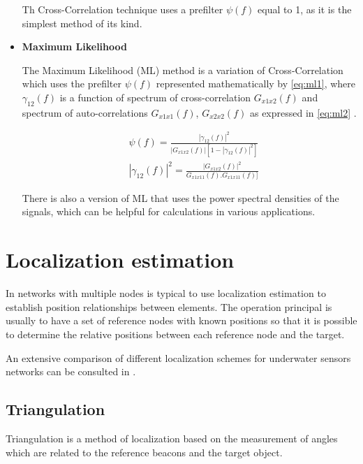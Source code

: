 \begin{itemize}
Th Cross-Correlation technique uses a prefilter $\psi(f)$ equal to 1, as it is the simplest method of its kind.

	\item \textbf{Maximum Likelihood}

The Maximum Likelihood (ML) method is a variation of Cross-Correlation which uses the prefilter $\psi(f)$ represented mathematically by \ref{eq:ml1}, where $\gamma_{12}(f)$ is a function of spectrum of cross-correlation $G_{x1x2}(f)$ and spectrum of auto-correlations $G_{x1x1}(f)$, $G_{x2x2}(f)$ as expressed in \ref{eq:ml2} \cite{crosscorr}.

\begin{eqnarray}
& \psi(f) = \frac{|\gamma_{12}(f)|^2}{|G_{x1x2}(f)|[1-|\gamma_{12}(f)|^2]}
\label{eq:ml1} \\
& |\gamma_{12}(f)|^2 = \frac{|G_{x1x2}(f)|^2}{G_{x1x11}(f) . G_{x1x11}(f)]}
\label{eq:ml2} 
\end{eqnarray}

There is also a version of ML that uses the power spectral densities of the signals, which can be helpful for calculations in various applications. 
\end{itemize}


\section{Localization estimation}

In networks with multiple nodes is typical to use localization estimation to establish position relationships between elements. The operation principal is usually to have a set of reference nodes with known positions so that it is possible to determine the relative positions between each reference node and the target. 

An extensive comparison of different localization schemes for underwater sensors networks can be consulted in \cite{suvey-loc}.

\subsection{Triangulation}

Triangulation is a method of localization based on the measurement of angles which are related to the reference beacons and the target object. 

